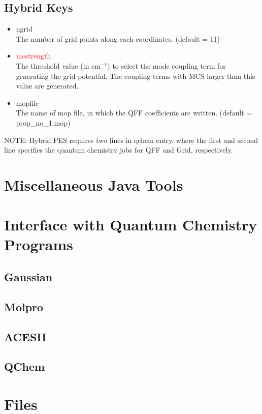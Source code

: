 \documentclass[a4paper,12pt]{article}
\begin{document}
\subsection{Hybrid Keys} \label{hybridKey}
   \begin{itemize}
     \item ngrid \\
       The number of grid points along each coordinates. (default = 11)
     \item \textcolor{red}{mcstrength} \\
       The threshold value (in $\mathrm{cm}^{-1}$) to select the mode coupling term for generating the grid potential. 
       The coupling terms with MCS larger than this value are generated.
     \item mopfile \\
       The name of mop file, in which the QFF coefficients are written. (default = prop\_no\_1.mop)
   \end{itemize}
   NOTE: Hybrid PES requires two lines in qchem entry, where the first and second line specifies the quantum 
   chemistry jobs for QFF and Grid, respectively.
 

\newpage
\section{Miscellaneous Java Tools} \label{tools}

\newpage
\section{Interface with Quantum Chemistry Programs} \label{interface}
\subsection{Gaussian}
\subsection{Molpro}
\subsection{ACESII}
\subsection{QChem}

\newpage
\section{Files}

\newpage


\end{document}
